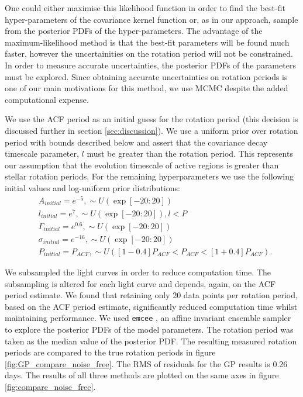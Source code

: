 One could either maximise this likelihood function in order to find the
best-fit hyper-parameters of the covariance kernel function or, as in our
approach, sample from the posterior PDFs of the hyper-parameters.
The advantage of the maximum-likelihood method is that the best-fit parameters
will be found much faster, however the uncertainities on the rotation period
will not be constrained.
In order to measure accurate uncertainties, the posterior PDFs of the
parameters must be explored.
Since obtaining accurate uncertainties on rotation periods is one of our main
motivations for this method, we use MCMC despite the added computational
expense.

We use the ACF period as an initial guess for the rotation period (this
decision is discussed further in section \textsection \ref{sec:discussion}).
We use a uniform prior over rotation period with bounds described below and
assert that the covariance decay timescale parameter, $l$ must be greater than
the rotation period.
This represents our assumption that the evolution timescale of active regions
is greater than stellar rotation periods.
For the remaining hyperparameters we use the following initial values and
log-uniform prior distributions:
\begin{eqnarray}
 	&	A_{initial} = e^{-5}, \sim U(\exp[-20:20]) \\ \nonumber
 	&	l_{initial} = e^{7}, \sim U(\exp[-20:20]), l<P \\ \nonumber
 	&	\Gamma_{initial} = e^{0.6}, \sim U(\exp[-20:20]) \\ \nonumber
 	&	\sigma_{initial} = e^{-16}, \sim U(\exp[-20:20]) \\ \nonumber
 	&	P_{initial} = P_{ACF}, \sim U([1 - 0.4]P_{ACF}<P_{ACF}<[1 +
0.4]P_{ACF}).
 \end{eqnarray}
 \label{eq:initialisation}

We subsampled the light curves in order to reduce computation time.
The subsampling is altered for each light curve and depends, again, on the ACF
period estimate.
We found that retaining only 20 data points per rotation period, based on the
ACF period estimate, significantly reduced computation time whilst maintaining
performance.
We used {\tt emcee} \citep{Foreman-Mackey13}, an affine invariant ensemble
sampler to explore the posterior PDFs of the model parameters.
The rotation period was taken as the median value of the posterior PDF.
The resulting measured rotation periods are compared to the true rotation
periods in figure \ref{fig:GP_compare_noise_free}.
The RMS of residuals for the GP results is 0.26 days.
The results of all three methods are plotted on the same axes in figure
\ref{fig:compare_noise_free}.

